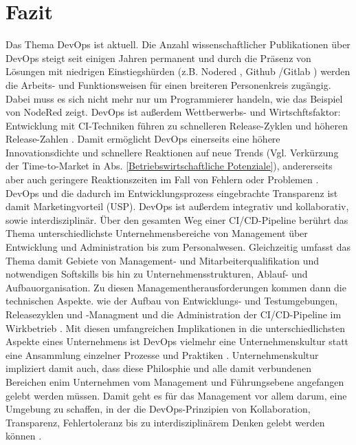 \section{Fazit}
\label{Fazit}
Das Thema \gls{DevOps} ist aktuell. Die Anzahl wissenschaftlicher Publikationen über \gls{DevOps} steigt seit einigen Jahren permanent \cite{leite_survey_2020} und durch die Präsenz von Lösungen mit niedrigen Einstiegshürden (z.B. Nodered \cite{nodered_about}, Github \cite{DevOps_Definition_Microsoft}/Gitlab \cite{gitlab_devops}) werden die Arbeits- und Funktionsweisen für einen breiteren Personenkreis zugängig. Dabei muss es sich nicht mehr nur um Programmierer handeln, wie das Beispiel von NodeRed zeigt.
\gls{DevOps} ist außerdem Wettberwerbs- und Wirtschftsfaktor: Entwicklung mit \acrshort{CI}-Techniken führen zu schnelleren Release-Zyklen und höheren Release-Zahlen \cite{forsgren_devops_2015} \cite{hilton_usage_2016}. Damit ermöglicht \gls{DevOps} einerseits eine höhere Innovationsdichte und schnellere Reaktionen auf neue Trends (Vgl. Verkürzung der \gls{Time-to-Market} in Abs. \ref{Betriebswirtschaftliche Potenziale}), andererseits aber auch geringere Reaktionszeiten im Fall von Fehlern oder Problemen \cite{zhao_impact_2017}. \gls{DevOps} und die dadurch im Entwicklungsprozess eingebrachte Transparenz ist damit Marketingvorteil (\acrshort{USP}).
\gls{DevOps} ist außerdem integrativ und kollaborativ, sowie interdisziplinär. Über den gesamten Weg einer \acrshort{CI}/\acrshort{CD}-Pipeline berührt das Thema unterschiedlichste Unternehmensbereiche von Management über Entwicklung und Administration bis zum Personalwesen. Gleichzeitig umfasst das Thema damit Gebiete von Management- und Mitarbeiterqualifikation und notwendigen Softskills bis hin zu Unternehmensstrukturen, Ablauf- und Aufbauorganisation. Zu diesen Managementherausforderungen kommen dann die technischen Aspekte. wie der Aufbau von Entwicklungs- und Testumgebungen, Releasezyklen und -Managment und die Administration der \acrshort{CI}/\acrshort{CD}-Pipeline im Wirkbetrieb \cite[Abb. 5 bis 8]{leite_survey_2020}. 
Mit diesen umfangreichen Implikationen in die unterschiedlichsten Aspekte eines Unternehmens ist  \gls{DevOps} vielmehr eine Unternehmenskultur statt eine Ansammlung einzelner Prozesse und Praktiken \cite{DevOps_Definition_Microsoft} \cite{DevOps_Definition_AWS}. Unternehmenskultur impliziert damit auch, dass diese Philosphie und alle damit verbundenen Bereichen enim Unternehmen vom Management und Führungsebene angefangen gelebt werden müssen. Damit geht es für das Management vor allem darum, eine Umgebung zu schaffen, in der die \gls{DevOps}-Prinzipien von Kollaboration, Transparenz, Fehlertoleranz bis zu interdisziplinärem Denken gelebt werden können \cite[Abschnitt 7.2]{leite_survey_2020}.
